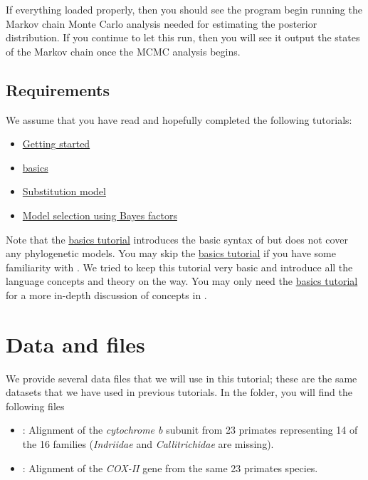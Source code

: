 If everything loaded properly, then you should see the program begin running the Markov chain Monte Carlo analysis needed for estimating the posterior distribution. 
If you continue to let this run, then you will see it output the states of the Markov chain once the MCMC analysis begins.

\subsection{Requirements}
We assume that you have read and hopefully completed the following tutorials:
\begin{itemize}
\item \href{https://github.com/revbayes/revbayes_tutorial/raw/master/tutorial_TeX/RB_Getting_Started/RB_Getting_Started.pdf}{Getting started}
\item \href{https://github.com/revbayes/revbayes_tutorial/raw/master/tutorial_TeX/RB_Basics_Tutorial/RB_Basics_Tutorial.pdf}{\Rev basics}
\item \href{https://github.com/revbayes/revbayes_tutorial/raw/master/tutorial_TeX/RB_CTMC_Tutorial/RB_CTMC_Tutorial.pdf}{Substitution model}
\item \href{https://github.com/revbayes/revbayes_tutorial/raw/master/tutorial_TeX/RB_BayesFactor_Tutorial/RB_BayesFactor_Tutorial.pdf}{Model selection using Bayes factors}
\end{itemize}
Note that the \href{https://github.com/revbayes/revbayes_tutorial/raw/master/tutorial_TeX/RB_Basics_Tutorial/RB_Basics_Tutorial.pdf}{\Rev basics tutorial} introduces the basic syntax of \Rev but does not cover any phylogenetic models.
You may skip the \href{https://github.com/revbayes/revbayes_tutorial/raw/master/tutorial_TeX/RB_Basics_Tutorial/RB_Basics_Tutorial.pdf}{\Rev basics tutorial} if you have some familiarity with \R.
We tried to keep this tutorial very basic and introduce all the language concepts and theory on the way.
You may only need the \href{https://github.com/revbayes/revbayes_tutorial/raw/master/tutorial_TeX/RB_Basics_Tutorial/RB_Basics_Tutorial.pdf}{\Rev basics tutorial} for a more in-depth discussion of concepts in \Rev.



\section{Data and files}

We provide several data files that we will use in this tutorial; these are the same datasets that we have used in previous tutorials.
In the  folder, you will find the following files
\begin{itemize}
\item
{}: Alignment of the \textit{cytochrome b} subunit from 23 primates representing 14 of the 16 families (\textit{Indriidae} and \textit{Callitrichidae} are missing).
\item
{}: Alignment of the \textit{COX-II} gene from the same 23 primates species.
\end{itemize}



